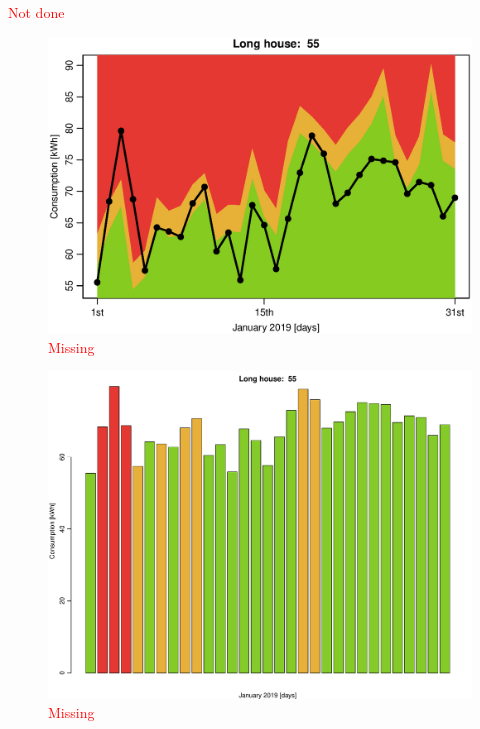 \noindent \textcolor{red}{Not done}
\begin{figure}
    \centering
    \includegraphics[width=.8\textwidth]{../../../figures/lmpred_col_55L.eps}
    \caption{\textcolor{red}{Missing}}
    \label{fig: lmpred_col_55L}
\end{figure}
\begin{figure}
    \centering
    \includegraphics[width=.8\textwidth]{../../../figures/lmpred_hist_55L.pdf}
    \caption{\textcolor{red}{Missing}}
    \label{fig: lmpred_hist_55L}
\end{figure}

